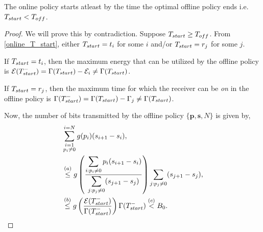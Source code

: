 \begin{lemma}
The online policy starts atleast by the time the optimal offline policy ends i.e. $T_{\mbox{\scriptsize{start}}} <T_{\mbox{\scriptsize{off}}}$.
\label{onilne_time}
\end{lemma}


\begin{proof}
We will prove this by contradiction. Suppose $T_{\mbox{\scriptsize{start}}} \ge T_{\mbox{\scriptsize{off}}}$. From \eqref{online_T_start}, either $T_{\mbox{\scriptsize{start}}}=t_i$ for some $i$ and/or $T_{\mbox{\scriptsize{start}}}=r_j$ for some $j$.

If $T_{\mbox{\scriptsize{start}}}=t_i$, then %
the maximum energy that can be utilized by the offline policy is $\ETx(T_{\mbox{\scriptsize{start}}}^-)=\TRx(T_{\mbox{\scriptsize{start}}})-\ETx_i\neq \TRx(T_{\mbox{\scriptsize{start}}})$.

If $T_{\mbox{\scriptsize{start}}}=r_j$, then the maximum time for which the receiver can be \textit{on} in the offline policy is $\TRx(T_{\mbox{\scriptsize{start}}}^-)=\TRx(T_{\mbox{\scriptsize{start}}})-\TRx_j\neq \TRx(T_{\mbox{\scriptsize{start}}})$.


Now, the number of bits transmitted by the offline policy $\{\bm{p},\bm{s},N\}$ is given by,
\begin{align}
&\sum_{{\substack{i=1\\p_i\neq 0}}}^{i=N} g(p_i)(s_{i+1}-s_{i}),
\\
&\nonumber \stackrel{(a)}{\le}g\left(\frac{\displaystyle\sum_{i:p_i\neq 0}p_i(s_{i+1}-s_{i})}{\displaystyle\sum_{j:p_j\neq 0}(s_{j+1}-s_{j})}\right)\sum_{j:p_j\neq 0} (s_{j+1}-s_{j}),
\\
&\stackrel{(b)}\le g\left(\frac{\ETx(T_{\mbox{\scriptsize{start}}}^-)}{\TRx(T_{\mbox{\scriptsize{start}}}^-)}\right)\TRx(T_{\mbox{\scriptsize{start}}}^-)\stackrel{(c)}{<}B_0.\label{online_eq_2}
\end{align}


\end{proof}
